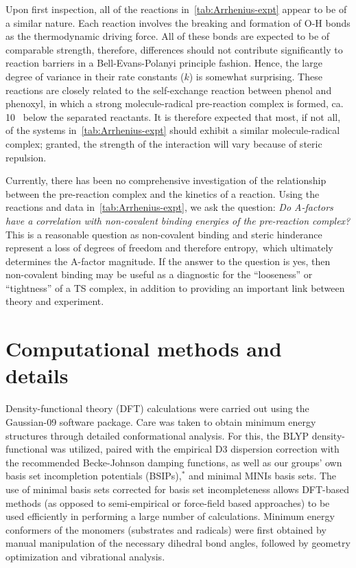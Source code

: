Upon first inspection, all of the reactions in~\ref{tab:Arrhenius-expt} appear to be of a similar nature. Each reaction involves the breaking and formation of O-H bonds as the thermodynamic driving force. All of these bonds are expected to be of comparable strength, therefore, differences should not contribute significantly to reaction barriers in a Bell-Evans-Polanyi principle fashion. Hence, the large degree of variance in their rate constants ($k$) is somewhat surprising. These reactions are closely related to the self-exchange reaction between phenol and phenoxyl,\cite{Mayer2002} in which a strong molecule-radical pre-reaction complex is formed, ca. 10 \kcalmol\ below the separated reactants. It is therefore expected that most, if not all, of the systems in~\ref{tab:Arrhenius-expt} should exhibit a similar molecule-radical complex; granted, the strength of the interaction will vary because of steric repulsion.

Currently, there has been no comprehensive investigation of the relationship between the pre-reaction complex and the kinetics of a reaction. Using the reactions and data in~\ref{tab:Arrhenius-expt}, we ask the question: \emph{Do A-factors have a correlation with non-covalent binding energies of the pre-reaction complex?} This is a reasonable question as non-covalent binding and steric hinderance represent a loss of degrees of freedom and therefore entropy,\footnotemark\ which ultimately determines the A-factor magnitude. If the answer to the question is yes, then non-covalent binding may be useful as a diagnostic for the ``looseness'' or ``tightness'' of a TS complex, in addition to providing an important link between theory and experiment.


\section{Computational methods and details}

Density-functional theory (DFT) calculations were carried out using the Gaussian-09 software package.\cite{Frisch2009} Care was taken to obtain minimum energy structures through detailed conformational analysis. For this, the BLYP density-functional\cite{Becke1988,Lee1988} was utilized, paired with the empirical D3 dispersion correction\cite{Grimme2010} with the recommended Becke-Johnson damping functions,\cite{Johnson2006} as well as our groups' own basis set incompletion potentials (BSIPs),$^*$ and minimal MINIs basis sets.\cite{Huzinaga1984} The use of minimal basis sets corrected for basis set incompleteness allows DFT-based methods (as opposed to semi-empirical or force-field based approaches) to be used efficiently in performing a large number of calculations. Minimum energy conformers of the monomers (substrates and radicals) were first obtained by manual manipulation of the necessary dihedral bond angles, followed by geometry optimization and vibrational analysis.

